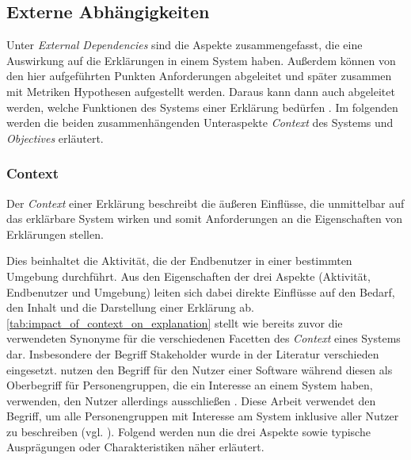 \subsection{Externe Abhängigkeiten}
\label{sec:model_external_dependencies}

Unter \textit{External Dependencies} sind die Aspekte zusammengefasst, die eine Auswirkung auf die Erklärungen in einem System haben. Außerdem können von den hier aufgeführten Punkten Anforderungen abgeleitet und später zusammen mit Metriken Hypothesen aufgestellt werden. Daraus kann dann auch abgeleitet werden, welche Funktionen des Systems einer Erklärung bedürfen \cite{kohl_explainability_2019}. Im folgenden werden die beiden zusammenhängenden Unteraspekte \textit{Context} des Systems und \textit{Objectives} erläutert.

\subsubsection{Context}

Der \textit{Context} einer Erklärung beschreibt die äußeren Einflüsse, die unmittelbar auf das erklärbare System wirken und somit Anforderungen an die Eigenschaften von Erklärungen stellen.

Dies beinhaltet die Aktivität, die der Endbenutzer in einer bestimmten Umgebung durchführt. Aus den Eigenschaften der drei Aspekte (Aktivität, Endbenutzer und Umgebung) leiten sich dabei direkte Einflüsse auf den Bedarf, den Inhalt und die Darstellung einer Erklärung ab. \autoref{tab:impact_of_context_on_explanation} stellt wie bereits zuvor die verwendeten Synonyme für die verschiedenen Facetten des \textit{Context} eines Systems dar. Insbesondere der Begriff Stakeholder wurde in der Literatur verschieden eingesetzt. \citeauthor{cirqueira_scenario-based_2020} nutzen den Begriff für den Nutzer einer Software \cite{cirqueira_scenario-based_2020} während \citeauthor{nunes_systematic_2017} diesen als Oberbegriff für Personengruppen, die ein Interesse an einem System haben, verwenden, den Nutzer allerdings ausschließen \cite{nunes_systematic_2017}. Diese Arbeit verwendet den Begriff, um alle Personengruppen mit Interesse am System inklusive aller Nutzer zu beschreiben (vgl. \cite{schneider2012abenteuer,chazette_knowledge_nodate}). Folgend werden nun die drei Aspekte sowie typische Ausprägungen oder Charakteristiken näher erläutert.

